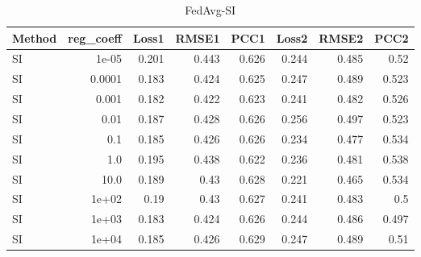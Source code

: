 \begin{table}
\caption{FedAvg-SI}
\begin{tabular}{lrrrrrrr}
\toprule
Method & reg_coeff & Loss1 & RMSE1 & PCC1 & Loss2 & RMSE2 & PCC2 \\
\midrule
SI & 1e-05 & 0.201 & 0.443 & 0.626 & 0.244 & 0.485 & 0.52 \\
SI & 0.0001 & 0.183 & 0.424 & 0.625 & 0.247 & 0.489 & 0.523 \\
SI & 0.001 & 0.182 & 0.422 & 0.623 & 0.241 & 0.482 & 0.526 \\
SI & 0.01 & 0.187 & 0.428 & 0.626 & 0.256 & 0.497 & 0.523 \\
SI & 0.1 & 0.185 & 0.426 & 0.626 & 0.234 & 0.477 & 0.534 \\
SI & 1.0 & 0.195 & 0.438 & 0.622 & 0.236 & 0.481 & 0.538 \\
SI & 10.0 & 0.189 & 0.43 & 0.628 & 0.221 & 0.465 & 0.534 \\
SI & 1e+02 & 0.19 & 0.43 & 0.627 & 0.241 & 0.483 & 0.5 \\
SI & 1e+03 & 0.183 & 0.424 & 0.626 & 0.244 & 0.486 & 0.497 \\
SI & 1e+04 & 0.185 & 0.426 & 0.629 & 0.247 & 0.489 & 0.51 \\
\bottomrule
\end{tabular}
\end{table}
